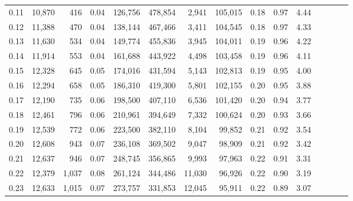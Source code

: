 \begin{tabular}{rrrcrrrrrrrrrrr}
0.11 &  10,870 &    416 &                                       0.04 &  126,756 &  478,854 &    2,941 &  105,015 &  0.18 &  0.97 &                         4.44 \\
0.12 &  11,388 &    470 &                                       0.04 &  138,144 &  467,466 &    3,411 &  104,545 &  0.18 &  0.97 &                         4.33 \\
0.13 &  11,630 &    534 &                                       0.04 &  149,774 &  455,836 &    3,945 &  104,011 &  0.19 &  0.96 &                         4.22 \\
0.14 &  11,914 &    553 &                                       0.04 &  161,688 &  443,922 &    4,498 &  103,458 &  0.19 &  0.96 &                         4.11 \\
0.15 &  12,328 &    645 &                                       0.05 &  174,016 &  431,594 &    5,143 &  102,813 &  0.19 &  0.95 &                         4.00 \\
0.16 &  12,294 &    658 &                                       0.05 &  186,310 &  419,300 &    5,801 &  102,155 &  0.20 &  0.95 &                         3.88 \\
0.17 &  12,190 &    735 &                                       0.06 &  198,500 &  407,110 &    6,536 &  101,420 &  0.20 &  0.94 &                         3.77 \\
0.18 &  12,461 &    796 &                                       0.06 &  210,961 &  394,649 &    7,332 &  100,624 &  0.20 &  0.93 &                         3.66 \\
0.19 &  12,539 &    772 &                                       0.06 &  223,500 &  382,110 &    8,104 &   99,852 &  0.21 &  0.92 &                         3.54 \\
0.20 &  12,608 &    943 &                                       0.07 &  236,108 &  369,502 &    9,047 &   98,909 &  0.21 &  0.92 &                         3.42 \\
0.21 &  12,637 &    946 &                                       0.07 &  248,745 &  356,865 &    9,993 &   97,963 &  0.22 &  0.91 &                         3.31 \\
0.22 &  12,379 &  1,037 &                                       0.08 &  261,124 &  344,486 &   11,030 &   96,926 &  0.22 &  0.90 &                         3.19 \\
0.23 &  12,633 &  1,015 &                                       0.07 &  273,757 &  331,853 &   12,045 &   95,911 &  0.22 &  0.89 &                         3.07 \\

\end{tabular}
